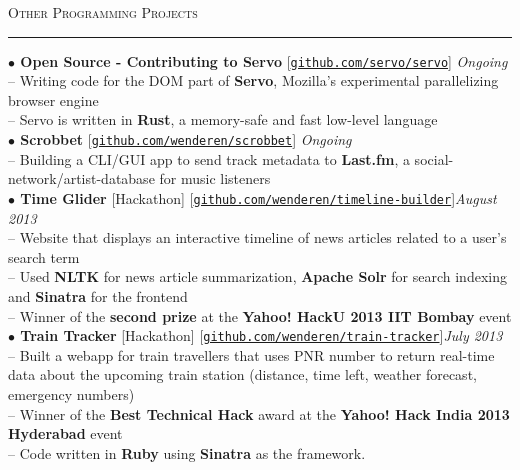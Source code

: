 \documentclass[a4paper,9pt]{article}
\begin{document}
\large{\textsc{Other Programming Projects}}\vspace{1.5pt}
\hrule\vspace{0.25cm}
\small
\textbf{$\bullet$ Open Source - Contributing to Servo} [\href{https://github.com/servo/servo}{\texttt{github.com/servo/servo}}] \hfill \textit{Ongoing}\\
-- Writing code for the DOM part of \textbf{Servo}, Mozilla's experimental parallelizing browser engine\\
-- Servo is written in \textbf{Rust}, a memory-safe and fast low-level language\\
\textbf{$\bullet$ Scrobbet} [\href{https://github.com/wenderen/scrobbet}{\texttt{github.com/wenderen/scrobbet}}] \hfill \textit{Ongoing}\\
-- Building a CLI/GUI app to send track metadata to \textbf{Last.fm}, a social-network/artist-database for music listeners\\
\textbf{$\bullet$ Time Glider} [Hackathon] [\href{https://github.com/wenderen/timeline-builder}{\texttt{github.com/wenderen/timeline-builder}}]\hfill \textit{August 2013}\\
-- Website that displays an interactive timeline of news articles related to a user's search term\\
-- Used \textbf{NLTK} for news article summarization, \textbf{Apache Solr} for search indexing and \textbf{Sinatra} for the frontend\\
-- Winner of the \textbf{second prize} at the \textbf{Yahoo! HackU 2013 IIT Bombay} event\\
\textbf{$\bullet$ Train Tracker} [Hackathon] [\href{https://github.com/wenderen/train-tracker}{\texttt{github.com/wenderen/train-tracker}}]\hfill \textit{July 2013}\\
-- Built a webapp for train travellers that uses PNR number to return real-time data about the upcoming train station (distance, time left, weather forecast, emergency numbers)\\
-- Winner of the \textbf{Best Technical Hack} award at the \textbf{Yahoo! Hack India 2013 Hyderabad} event\\
-- Code written in \textbf{Ruby} using \textbf{Sinatra} as the framework.\\
\end{document}
